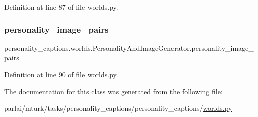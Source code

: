 Definition at line 87 of file worlds.\+py.

\mbox{\label{classpersonality__captions_1_1worlds_1_1PersonalityAndImageGenerator_a28343ba1f0f6ee18157127f40bcac251}} 
\subsubsection{\texorpdfstring{personality\+\_\+image\+\_\+pairs}{personality\_image\_pairs}}
{\footnotesize\ttfamily personality\+\_\+captions.\+worlds.\+Personality\+And\+Image\+Generator.\+personality\+\_\+image\+\_\+pairs}



Definition at line 90 of file worlds.\+py.



The documentation for this class was generated from the following file\+:\begin{DoxyCompactItemize}
\item 
parlai/mturk/tasks/personality\+\_\+captions/personality\+\_\+captions/\hyperlink{parlai_2mturk_2tasks_2personality__captions_2personality__captions_2worlds_8py}{worlds.\+py}\end{DoxyCompactItemize}
